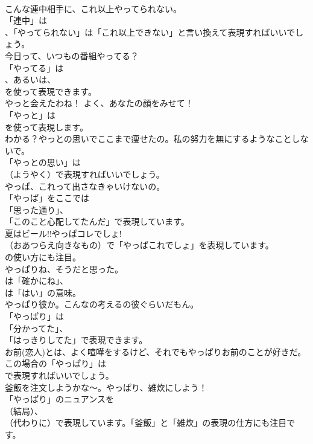 \documentclass[8pt]{extreport}
\begin{document}
\begin{CJK}{UTF8}{min}
\\	こんな連中相手に、これ以上やってられない。 
\\	「連中」は
\\	、「やってられない」は「これ以上できない」と言い換えて表現すればいいでしょう。	
\\	今日って、いつもの番組やってる？ 
\\	「やってる」は
\\	、あるいは、
\\	を使って表現できます。	
\\	やっと会えたわね！ よく、あなたの顔をみせて！ 
\\	「やっと」は
\\	を使って表現します。	
\\	わかる？やっとの思いでここまで痩せたの。私の努力を無にするようなことしないで。 
\\	「やっとの思い」は 
\\	（ようやく）で表現すればいいでしょう。	
\\	やっぱ、これって出さなきゃいけないの。 
\\	「やっぱ」をここでは
\\	「思った通り」、
\\	「このこと心配してたんだ」で表現しています。	
\\	夏はビール!!やっぱコレでしょ! 
\\	（おあつらえ向きなもの）で「やっぱこれでしょ」を表現しています。
\\	の使い方にも注目。	
\\	やっぱりね、そうだと思った。 
\\	は「確かにね」、
\\	は「はい」の意味。	
\\	やっぱり彼か。こんなの考えるの彼ぐらいだもん。 
\\	「やっぱり」は
\\	「分かってた」、
\\	「はっきりしてた」で表現できます。	
\\	お前(恋人)とは、よく喧嘩をするけど、それでもやっぱりお前のことが好きだ。 
\\	この場合の「やっぱり」は
\\	で表現すればいいでしょう。	
\\	釜飯を注文しようかな～。やっぱり、雑炊にしよう！ 
\\	「やっぱり」のニュアンスを 
\\	（結局）、
\\	（代わりに）で表現しています。「釜飯」と「雑炊」の表現の仕方にも注目です。	

\end{CJK}
\end{document}
